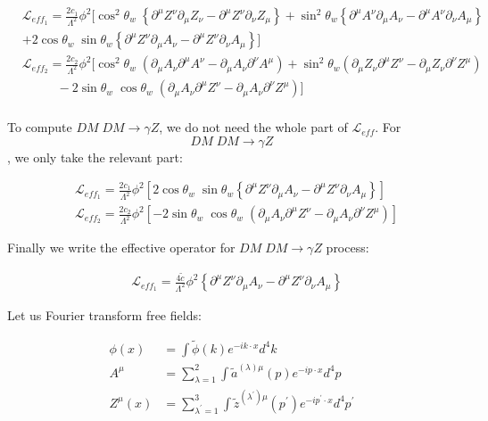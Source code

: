 \documentclass[12pt]{report}
\begin{document}
\begin{align*}
&\mathscr{L}_{eff_1}=\frac{2c_1}{\Lambda^2} \phi^2 [\cos^2\theta_w\; \left\{ \partial^\mu Z^\nu \partial_\mu Z_\nu- \partial^\mu Z^\nu \partial_\nu Z_\mu \right\}+\sin^2\theta_w \left\{ \partial^\mu A^\nu \partial_\mu A_\nu - \partial^\mu A^\nu \partial_\nu A_\mu  \right\} \\
&+2 \cos\theta_w \; \sin\theta_w \left\{ \partial^\mu Z^\nu \partial_\mu A_\nu - \partial^\mu Z^\nu \partial_\nu A_\mu \right\} ]\\
&\mathscr{L}_{eff_2}=\frac{2c_2}{\Lambda^2} \phi^2 [\cos^2\theta_w \; (\partial_\mu A_\nu \partial^\mu A^\nu-\partial_\mu A_\nu \partial^\nu A^\mu)+\sin^2\theta_w(\partial_\mu Z_\nu \partial^\mu Z^\nu - \partial_\mu Z_\nu \partial^\nu Z^\mu)\\
&\;\;\;\;\;\;\;\;\;\; -2 \sin\theta_w \; \cos\theta_w \; (\partial_\mu A_\nu \partial^\mu Z^\nu-\partial_\mu A_\nu \partial^\nu Z^\mu)]\\
\end{align*}



To compute $DM\; DM \longrightarrow \gamma Z$, we do not need the whole part of $\mathscr{L}_{eff}$.  For $$DM \; DM \longrightarrow \gamma Z$$, we only take the relevant part:

\begin{align*}
&\mathscr{L}_{eff_1}=\frac{2c_1}{\Lambda^2} \phi^2 [2 \cos\theta_w \; \sin\theta_w \left\{ \partial^\mu Z^\nu \partial_\mu A_\nu - \partial^\mu Z^\nu \partial_\nu A_\mu \right\}]\\
&\mathscr{L}_{eff_2}=\frac{2c_2}{\Lambda^2} \phi^2 [-2 \sin\theta_w \; \cos\theta_w \; (\partial_\mu A_\nu \partial^\mu Z^\nu-\partial_\mu A_\nu \partial^\nu Z^\mu)]
\end{align*}





Finally we write the effective operator for $DM \; DM \longrightarrow \gamma Z$ process:


\begin{align}
&\mathscr{L}_{eff_1} = \frac{4 \tilde{c}}{\Lambda^2} \phi^2  \left\{ \partial^\mu Z^\nu \partial_\mu A_\nu - \partial^\mu Z^\nu \partial_\nu A_\mu \right\}
\end{align}


Let us Fourier transform free fields:

\begin{align*}
\phi(x) &= \int \tilde{\phi}(k) e^{-i k \cdot x} d^4k\\
A^\mu &= \sum_{\lambda=1}^2 \int \tilde{a}^{(\lambda)\mu}(p) e^{- i p \cdot x} d^4p\\
Z^\mu(x)&= \sum_{\lambda^\prime =1}^3 \int \tilde{z}^{(\lambda^\prime) \mu}(p^\prime) e^{-i p^\prime \cdot x} d^4p^\prime
\end{align*}
\end{document}
